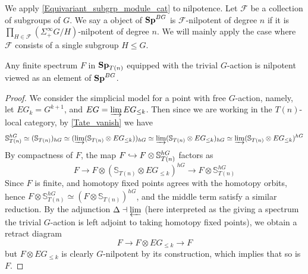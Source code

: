 	\begin{const}\label{Subgrp_nilp_exp}
		We apply \cref{Equivariant_subgrp_module_cat} to nilpotence. Let $\mathcal{F}$ be a collection of subgroups of $G$. We say a object of $\mathbf{Sp}^{BG}$ is $\mathcal{F}$-nilpotent of degree $n$ if it is $\prod_{H\in\mathcal{F}}(\Sigma^\infty_+G/H)$-nilpotent of degree $n$. We will mainly apply the case where $\mathcal{F}$ consists of a single subgroup $H\leq G$. 
	\end{const}

	\begin{thm}\label{Fin_sp_nilp_fin_grp}
		Any finite spectrum $F$ in $\mathbf{Sp}_{T(n)}$ equipped with the trivial $G$-action is nilpotent viewed as an element of $\mathbf{Sp}^{BG}$. 
	\end{thm}
	\begin{proof}
		We consider the simplicial model for a point with free $G$-action, namely, let $EG_k=G^{k+1}$, and $EG=\varinjlim EG_{\leq k}$. Then since we are working in the $T(n)$-local category, by \cref{Tate_vanish} we have 
		\[ \mathbb{S}_{T(n)}^{hG}\simeq(\mathbb{S}_{T(n)})_{hG}\simeq(\varinjlim(\mathbb{S}_{T(n)}\otimes EG_{\leq k}))_{hG}\simeq\varinjlim(\mathbb{S}_{T(n)}\otimes EG_{\leq k})_{hG}\simeq\varinjlim(\mathbb{S}_{T(n)}\otimes EG_{\leq k})^{hG} \]
		By compactness of $F$, the map $F\hookrightarrow F\otimes\mathbb{S}_{T(n)}^{hG}$ factors as 
		\[ F\to F\otimes(\mathbb{S}_{T(n)}\otimes EG_{\leq k})^{hG}\to F\otimes\mathbb{S}_{T(n)}^{hG} \]
		Since $F$ is finite, and homotopy fixed points agrees with the homotopy orbits, hence $F\otimes\mathbb{S}_{T(n)}^{hG}\simeq(F\otimes\mathbb{S}_{T(n)})^{hG}$, and the middle term satisfy a similar reduction. By the adjunction $\Delta\dashv\varprojlim$ (here interpreted as the giving a spectrum the trivial $G$-action is left adjoint to taking homotopy fixed points), we obtain a retract diagram 
		\[ F\to F\otimes EG_{\leq k}\to F \]
		but $F\otimes EG_{\leq k}$ is clearly $G$-nilpotent by its construction, which implies that so is $F$. 
	\end{proof}

